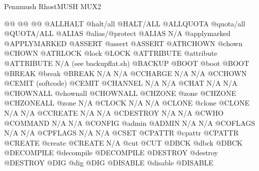 \documentclass[letterpaper,10pt,english]{sphinxmanual}
\begin{document}
\begin{sphinxVerbatim}[commandchars=\\\{\}]
Pennmush                RhostMUSH                      MUX2

@@                      @@                             @@
@ALLHALT                @halt/all                      @HALT/ALL
@ALLQUOTA               @quota/all                     @QUOTA/ALL
@ALIAS                  @alias/@protect                @ALIAS
N/A                     @apply\PYGZus{}marked                  @APPLY\PYGZus{}MARKED
@ASSERT                 @assert                        @ASSERT
@ATRCHOWN               @chown                         @CHOWN
@ATRLOCK                @lock                          @LOCK
@ATTRIBUTE              @attribute                     @ATTRIBUTE
N/A                     (see backup\PYGZus{}flat.sh)           @BACKUP
@BOOT                   @boot                          @BOOT
@BREAK                  @break                         @BREAK
N/A                     N/A                            @CCHARGE
N/A                     N/A                            @CCHOWN
@CEMIT                  (softcode)                     @CEMIT
@CHANNEL                N/A                            N/A
@CHAT                   N/A                            N/A
@CHOWNALL               @chownall                      @CHOWNALL
@CHZONE                 @zone                          @CHZONE
@CHZONEALL              @zone                          N/A
@CLOCK                  N/A                            N/A
@CLONE                  @clone                         @CLONE
N/A                     N/A                            @CCREATE
N/A                     N/A                            @CDESTROY
N/A                     N/A                            @CWHO
@COMMAND                N/A                            N/A
@CONFIG                 @admin                         @ADMIN
N/A                     N/A                            @COFLAGS
N/A                     N/A                            @CPFLAGS
N/A                     N/A                            @CSET
@CPATTR                 @cpattr                        @CPATTR
@CREATE                 @create                        @CREATE
N/A                     @cut                           @CUT
@DBCK                   @dbck                          @DBCK
@DECOMPILE              @decompile                     @DECOMPILE
@DESTROY                @destroy                       @DESTROY
@DIG                    @dig                           @DIG
@DISABLE                @disable                       @DISABLE

\end{sphinxVerbatim}
\end{document}
